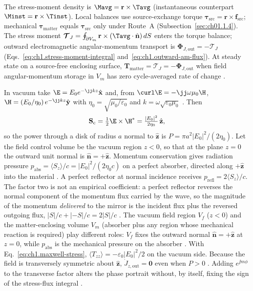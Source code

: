 The stress-moment density is $\Mavg=\mathbf{r}\times\Tavg$ (instantaneous counterpart $\Minst=\mathbf{r}\times\Tinst$). Local balances use source-exchange torque $\boldsymbol{\tau}_{\mathrm{src}}=\mathbf{r}\times\mathbf{f}_{\mathrm{src}}$; mechanical $\boldsymbol{\tau}_{\mathrm{matter}}$ equals $\boldsymbol{\tau}_{\mathrm{src}}$ only under Route~A (Subsection~\ref{sec:ch01.1.4}). The stress moment $\boldsymbol{\mathcal{T}}_J=\oint_{\partial V_m}\mathbf{r}\times(\Tavg\cdot\hat{\mathbf{n}})\,dS$ enters the torque balance; outward electromagnetic angular-momentum transport is $\boldsymbol{\Phi}_{J,\mathrm{out}}=-\boldsymbol{\mathcal{T}}_J$ (Eqs.~\eqref{eq:ch1.stress-moment-integral} and~\eqref{eq:ch1.outward-am-flux}). At steady state on a source-free enclosing surface, $\mathbf{T}_{\mathrm{matter}}=\boldsymbol{\mathcal{T}}_J=-\boldsymbol{\Phi}_{J,\mathrm{out}}$ when field angular-momentum storage in $V_m$ has zero cycle-averaged rate of change \cite{beth1936,stratton1941}.

In vacuum take
$\E=E_0 e^{-\jj k z}\hat{\mathbf{x}}$ and, from $\curl\E=-\jj\omega\mu_0\H$,
$\H=(E_0/\eta_0)\,e^{-\jj k z}\hat{\mathbf{y}}$ with
$\eta_0=\sqrt{\mu_0/\varepsilon_0}$ and $k=\omega\sqrt{\varepsilon_0\mu_0}$
\cite{stratton1941}. Then
\begin{equation}
\label{eq:ch1.intro-plane-wave-preview}
\mathbf{S}_\mathrm{c}=\tfrac12\E\times\H^*=\tfrac{|E_0|^2}{2\eta_0}\,\hat{\mathbf{z}},
\end{equation}
so the power through a disk of radius $a$ normal to $\hat{\mathbf{z}}$ is
$P=\pi a^2 |E_0|^2/(2\eta_0)$. Let the field control volume be the vacuum region
$z<0$, so that at the plane $z=0$ the outward unit normal is $\hat{\mathbf{n}}=+\hat{\mathbf{z}}$.
Momentum conservation gives radiation pressure $p_{\mathrm{abs}}=\langle S_z\rangle/c=
|E_0|^2/(2\eta_0 c)$ on a perfect absorber, directed along $+\hat{\mathbf{z}}$ into the
material \cite{stratton1941}. A perfect reflector at normal incidence receives
$p_{\mathrm{refl}}=2\langle S_z\rangle/c$. The factor two is not an empirical coefficient: a perfect reflector reverses the normal component of the momentum flux carried by the wave, so the magnitude of the momentum \emph{delivered} to the mirror is the incident flux plus the reversed outgoing flux, $|S|/c+|{-S}|/c=2|S|/c$ \cite{maxwell1873,stratton1941}. The vacuum field region $V_f$ ($z<0$) and the matter-enclosing volume $V_m$ (absorber plus any region whose mechanical reaction is required) play different roles: $V_f$ fixes the outward normal $\hat{\mathbf{n}}=+\hat{\mathbf{z}}$ at $z=0$, while $p_{\mathrm{abs}}$ is the mechanical pressure on the absorber \cite{maxwell1873,stratton1941}. With Eq.~\eqref{eq:ch1.maxwell-stress}, $\langle T_{zz}\rangle=-\varepsilon_0|E_0|^2/2$ on the vacuum side. Because the field is transversely symmetric
about $\hat{\mathbf{z}}$, $\dot J_{z,\mathrm{out}}=\mathbf{0}$ even
when $P>0$ \cite{beth1936}. Adding $e^{\jj m\phi}$ to the transverse factor alters the
phase portrait without, by itself, fixing the sign of the stress-flux integral
\cite{allen1992,stratton1941}.

